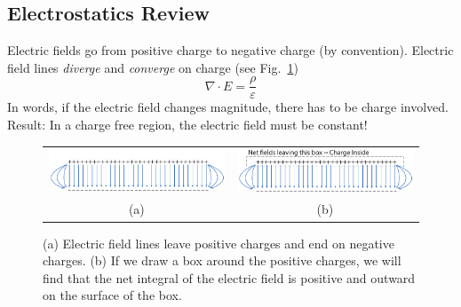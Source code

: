 \subsection{Electrostatics Review }
Electric fields go from positive charge to negative charge (by convention).   Electric field lines \textit{diverge} and \textit{converge} on charge (see Fig.~\ref{fig:mod2-2_ICtech_sld_11})
\begin{equation} 
	\nabla  \cdot E = \frac{\rho }{\varepsilon } 
\end{equation}
In words, if the electric field changes magnitude, there has to be charge involved.
 Result: In a charge free region, the electric field must be constant!
\begin{figure}[tb]
\begin{center}
\begin{tabular}{cc}
\includegraphics[width=.5\columnwidth]{charge_fields} &
\includegraphics[width=.5\columnwidth]{charge_fields_guass} \\
(a) & (b) \\
\end{tabular}
\end{center}
\caption{(a) Electric field lines leave positive charges and end on negative charges.  (b) If we draw a box around the positive charges, we will find that the net integral of the electric field is positive and outward on the surface of the box.}
\label{fig:mod2-2_ICtech_sld_11}
\end{figure}

